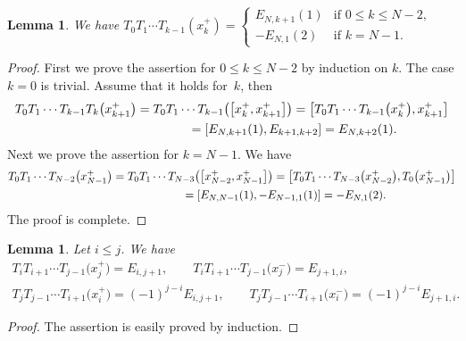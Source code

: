 \documentclass[pdftex]{sigma}
\newtheorem{lem}[thm]{Lemma}
\theoremstyle{definition}
\numberwithin{equation}{section}
\begin{document}
\begin{lem}\label{lem:0_to_k}We have $T_0 T_1 \cdots T_{k-1} (x_k^+) = \begin{cases}
E_{N,k+1}(1) & \text{if $0 \leq k \leq N-2$},\\
-E_{N,1}(2) & \text{if $k=N-1$}.
\end{cases}$
\end{lem}
\begin{proof} First we prove the assertion for $0 \leq k \leq N-2$ by induction on $k$. The case $k=0$ is trivial. Assume that it holds for~$k$, then
\begin{gather*}
T_0 T_1 \cdots T_{k-1} T_{k} \big(x_{k+1}^+\big) = T_0 T_1 \cdots T_{k-1} \big(\big[x_{k}^+, x_{k+1}^+\big]\big) = \big[T_0 T_1 \cdots T_{k-1}\big(x_{k}^+\big), x_{k+1}^+\big] \\
\hphantom{T_0 T_1 \cdots T_{k-1} T_{k} \big(x_{k+1}^+\big)}{} = [E_{N,k+1}(1), E_{k+1,k+2}] = E_{N,k+2}(1).
\end{gather*}
Next we prove the assertion for $k=N-1$. We have
\begin{gather*}
T_0 T_1 \cdots T_{N-2} \big(x_{N-1}^+\big) = T_0 T_1 \cdots T_{N-3} \big(\big[x_{N-2}^+, x_{N-1}^+\big]\big) = \big[T_0 T_1 \cdots T_{N-3}\big(x_{N-2}^+\big), T_0\big(x_{N-1}^+\big)\big] \\
\hphantom{T_0 T_1 \cdots T_{N-2} \big(x_{N-1}^+\big)}{} = [E_{N,N-1}(1), -E_{N-1,1}(1)] = -E_{N,1}(2).
\end{gather*}
The proof is complete.
\end{proof}

\begin{lem}Let $i \leq j$. We have
\begin{gather}
T_{i} T_{i+1} \cdots T_{j-1} \big(x_{j}^+\big) = E_{i,j+1},\qquad T_{i} T_{i+1} \cdots T_{j-1} \big(x_{j}^-\big) = E_{j+1,i}, \label{eq:increase}\\
T_{j} T_{j-1} \cdots T_{i+1} \big(x_{i}^+\big) = (-1)^{j-i}E_{i,j+1},\qquad T_{j} T_{j-1} \cdots T_{i+1} \big(x_{i}^-\big) = (-1)^{j-i}E_{j+1,i}. \label{eq:decrease}
\end{gather}
\end{lem}
\begin{proof}The assertion is easily proved by induction.
\end{proof}
\end{document}
